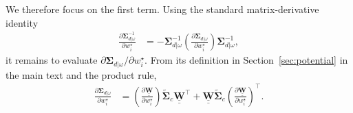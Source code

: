 \documentclass[12pt]{article}
\newcommand{\mybcirc}[1] {\underline{\underline{\bm{#1}}}}
\begin{document}
We therefore focus on the first term. Using the standard matrix-derivative identity
\begin{equation}
\begin{split}
    \frac{\partial \bm{\Sigma}_{d|\omega}^{-1}}
    {\partial w_i^\star}
    &=
    -
    \bm{\Sigma}_{d|\omega}^{-1}
    \left(
        \frac{\partial \bm{\Sigma}_{d|\omega}}
        {\partial w_i^\star}
    \right)
    \bm{\Sigma}_{d|\omega}^{-1},
\end{split}
\end{equation}
it remains to evaluate
$\partial \bm{\Sigma}_{d|\omega}/\partial w_i^\star$.
From its definition in Section~\ref{sec:potential} in the main text and the product rule,
\begin{equation}
\label{eq:gradient_ss_app_sigma_derivative}
\begin{split}
    \frac{\partial \bm{\Sigma}_{d|\omega}}
    {\partial w_i^\star}
    &=
    \left(
        \frac{\partial \mybcirc{W}}
        {\partial w_i^\star}
    \right)
    \tilde{\bm{\Sigma}}_c
    \mybcirc{W}^{\top}
    +
    \mybcirc{W}
    \tilde{\bm{\Sigma}}_c
    \left(
        \frac{\partial \mybcirc{W}}
        {\partial w_i^\star}
    \right)^{\top}.
\end{split}
\end{equation}
\end{document}
